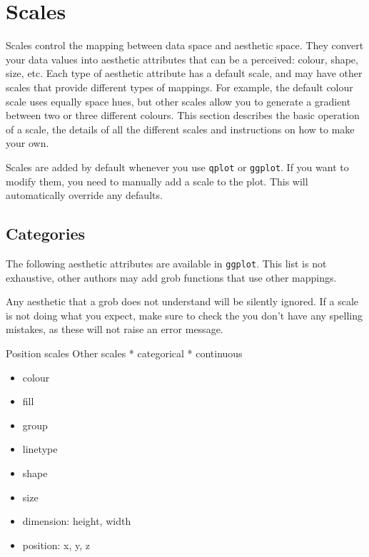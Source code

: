 \section{Scales}\label{sec:introduction}

Scales control the mapping between data space and aesthetic space.  They convert your data values into aesthetic attributes that can be a perceived: colour, shape, size, etc.  Each type of aesthetic attribute has a default scale, and may have other scales that provide different types of mappings.  For example, the default colour scale uses equally space hues, but other scales allow you to generate a gradient between two or three different colours.  This section describes the basic operation of a scale, the details of all the different scales and instructions on how to make your own.

Scales are added by default whenever you use {\tt qplot} or {\tt ggplot}.  If you want to modify them, you need to manually add a scale to the plot.  This will automatically override any defaults.


\subsection{Categories}\label{sec:categories} 

The following aesthetic attributes are available in {\tt ggplot}.  This list is not exhaustive, other authors may add grob functions that use other mappings.  

Any aesthetic that a grob does not understand will be silently ignored.  If a scale is not doing what you expect, make sure to check the you don't have any spelling mistakes, as these will not raise an error message.

Position scales
Other scales
 * categorical
 * continuous

\begin{itemize}
	\item colour
	\item fill
	\item group
	\item linetype
	\item shape
	\item size
	\item dimension: height, width
	\item position: x, y, z
\end{itemize}

